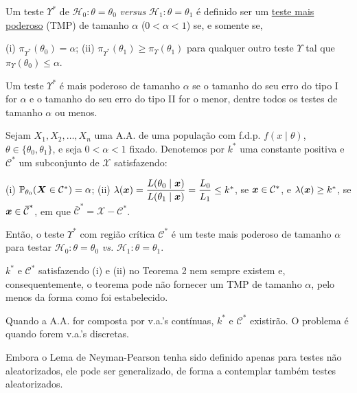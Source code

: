 \begin{definition}
Um teste $\Upsilon^*$ de $\mathcal{H}_0:\theta=\theta_0$ \emph{versus} $\mathcal{H}_1:\theta=\theta_1$ é definido ser um \uline{teste mais poderoso} (TMP) de tamanho $\alpha$ ($0<\alpha<1$) se, e somente se,
\begin{outline}
\1 (i) $\pi_{\Upsilon^*}(\theta_0)=\alpha$;
\1 (ii) $\pi_{\Upsilon^*}(\theta_1)\geq\pi_\Upsilon(\theta_1)$ para qualquer outro teste $\Upsilon$ tal que $\pi_\Upsilon(\theta_0)\leq\alpha$.
\end{outline}
\end{definition}

\begin{note}
Um teste $\Upsilon^*$ é mais poderoso de tamanho $\alpha$ se o tamanho do seu erro do tipo I for $\alpha$ e o tamanho do seu erro do tipo II for o menor, dentre todos os testes de tamanho $\alpha$ ou menos.
\end{note}

\begin{theorem}
Sejam $X_1,X_2,\ldots,X_n$ uma A.A. de uma população com f.d.p. $f(x\mid\theta)$, $\theta\in\{\theta_0,\theta_1\}$, e seja $0<\alpha<1$ fixado. Denotemos por $k^*$ uma constante positiva e $\mathcal{C}^*$ um subconjunto de $\mathcal{X}$ satisfazendo:
\begin{outline}
\1 (i) $\mathbb{P}_{\theta_0}(\bm{X}\in\mathcal{C}^*)=\alpha$;
\1 (ii) $\lambda(\bm{x})=\dfrac{L(\theta_0\mid\bm{x})}{L(\theta_1\mid\bm{x})}=\dfrac{L_0}{L_1}\leq k^*$, se $\bm{x}\in\mathcal{C}^*$, e $\lambda(\bm{x})\geq k^*$, se $\bm{x}\in\,\overline{\!{\mathcal{C}}}^*$, em que $\bar{\mathcal{C}}^*=\mathcal{X}-\mathcal{C}^*$.
\end{outline}
Então, o teste $\Upsilon^*$ com região crítica $\mathcal{C}^*$ é um teste mais poderoso de tamanho $\alpha$ para testar $\mathcal{H}_0:\theta=\theta_0$ \emph{vs.} $\mathcal{H}_1:\theta=\theta_1$.
\end{theorem}

\begin{note}
$k^*$ e $\mathcal{C}^*$ satisfazendo (i) e (ii) no Teorema 2 nem sempre existem e, consequentemente, o teorema pode não fornecer um TMP de tamanho $\alpha$, pelo menos da forma como foi estabelecido.

Quando a A.A. for composta por v.a.'s contínuas, $k^*$ e $\mathcal{C}^*$ existirão. O problema é quando forem v.a.'s discretas.

Embora o Lema de Neyman-Pearson tenha sido definido apenas para testes não aleatorizados, ele pode ser generalizado, de forma a contemplar também testes aleatorizados.
\end{note}


